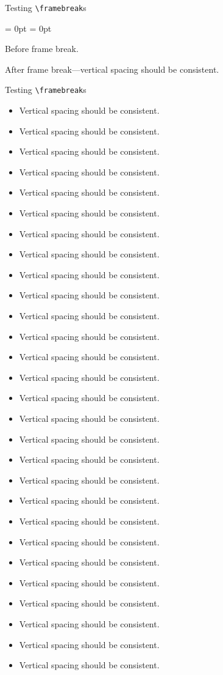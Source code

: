 \documentclass[aspectratio = 169, t, 10pt]{beamer}
\begin{document}
\begin{frame}[allowframebreaks]{Testing \texttt{\textbackslash framebreak}s}

\begin{list}{}{\leftmargin = 0pt \itemindent = 0pt}
	\item Before frame break.
	\framebreak
	\item After frame break---vertical spacing should be consistent.
\end{list}

\end{frame}


\begin{frame}[allowframebreaks]{Testing \texttt{\textbackslash framebreak}s}

\begin{itemize}
	\item Vertical spacing should be consistent.
	\item Vertical spacing should be consistent.
	\item Vertical spacing should be consistent.
	\item Vertical spacing should be consistent.
	\item Vertical spacing should be consistent.
	\item Vertical spacing should be consistent.
	\item Vertical spacing should be consistent.
	\item Vertical spacing should be consistent.
	\item Vertical spacing should be consistent.
	\item Vertical spacing should be consistent.
	\item Vertical spacing should be consistent.
	\item Vertical spacing should be consistent.
	\item Vertical spacing should be consistent.
	\item Vertical spacing should be consistent.
	\item Vertical spacing should be consistent.
	\item Vertical spacing should be consistent.
	\item Vertical spacing should be consistent.
	\item Vertical spacing should be consistent.
	\item Vertical spacing should be consistent.
	\item Vertical spacing should be consistent.
	\item Vertical spacing should be consistent.
	\item Vertical spacing should be consistent.
	\item Vertical spacing should be consistent.
	\item Vertical spacing should be consistent.
	\item Vertical spacing should be consistent.
	\item Vertical spacing should be consistent.
	\item Vertical spacing should be consistent.
	\item Vertical spacing should be consistent.
\end{itemize}


\end{frame}
\end{document}
